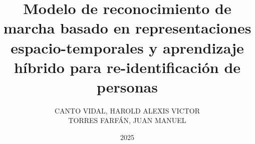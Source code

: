 \documentclass[a4paper,12pt,oneside]{tesisutec}
\begin{document}
\frontmatter


\title{Modelo de reconocimiento de marcha basado en representaciones espacio-temporales y aprendizaje híbrido para re-identificación de personas}

\author{
  CANTO VIDAL, HAROLD ALEXIS VICTOR  \\
  TORRES FARFÁN, JUAN MANUEL  
}


\date{2025}

\maketitle


% 
% 

\tableofcontents

\newpage

\listoftables

\newpage



\mainmatter
\pagestyle{fancy}


 

% 



% 

% 


\renewcommand{\bibname}{\hfill\Large\bf{REFERENCIAS BIBLIOGRÁFICAS}\hfill}




% 
\end{document}
